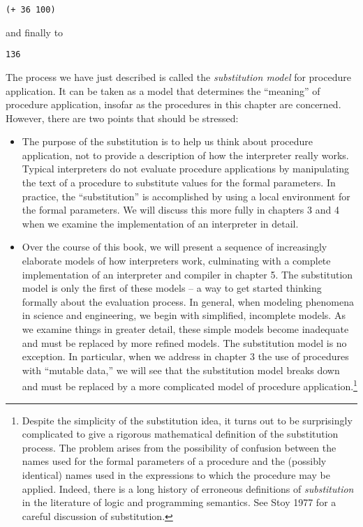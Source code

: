 \begin{verbatim}
(+ 36 100)
\end{verbatim}

and finally to

\begin{verbatim}
136
\end{verbatim}

The process we have just described is called the \textit{substitution
model} for procedure application.  It can be taken as a model that
determines the ``meaning'' of procedure application, insofar as the
procedures in this chapter are concerned.  However, there are two
points that should be stressed:

\begin{itemize}
\item The purpose of the substitution is to help us think about procedure
application, not to provide a description of how the interpreter
really works.  Typical interpreters do not evaluate procedure
applications by manipulating the text of a procedure to substitute
values for the formal parameters.  In practice, the ``substitution''
is accomplished by using a local environment for the formal
parameters.  We will discuss this more fully in chapters 3 and 4 when
we examine the implementation of an interpreter in detail.

\item Over the course of this book, we will present a sequence of
  increasingly elaborate models of how interpreters work, culminating
  with a complete implementation of an interpreter and compiler in
  chapter 5.  The substitution model is only the first of these models
  -- a way to get started thinking formally about the evaluation
  process.  In general, when modeling phenomena in science and
  engineering, we begin with simplified, incomplete models.  As we
  examine things in greater detail, these simple models become
  inadequate and must be replaced by more refined models.  The
  substitution model is no exception.  In particular, when we address
  in chapter 3 the use of procedures with ``mutable data,'' we will
  see that the substitution model breaks down and must be replaced by
  a more complicated model of procedure application.\footnote{Despite
    the simplicity of the substitution idea, it turns out to be
    surprisingly complicated to give a rigorous mathematical
    definition of the substitution process.  The problem arises from
    the possibility of confusion between the names used for the formal
    parameters of a procedure and the (possibly identical) names used
    in the expressions to which the procedure may be applied.  Indeed,
    there is a long history of erroneous definitions of
    \textit{substitution} in the literature of logic and programming
    semantics.  See Stoy 1977 for a careful discussion of
    substitution.}
\end{itemize}

